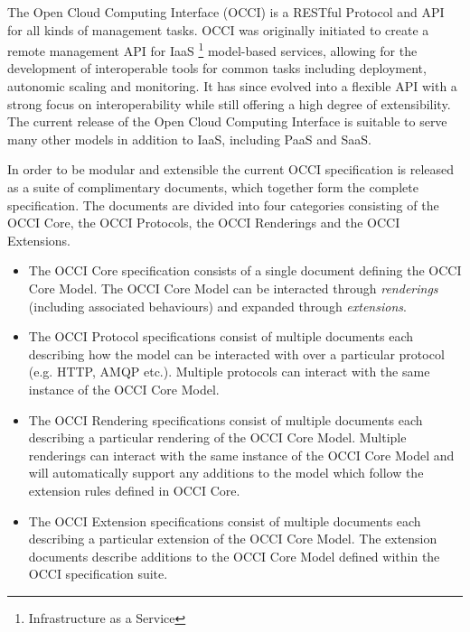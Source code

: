 The Open Cloud Computing Interface (OCCI) is a RESTful Protocol and
API for all kinds of management tasks. OCCI was originally initiated
to create a remote management API for IaaS%
\footnote{Infrastructure as a Service}
model-based services, allowing for the development of interoperable tools for
common tasks including deployment, autonomic scaling and monitoring.
%
It has since evolved into a flexible API with a strong focus on
interoperability while still offering a high degree of extensibility. The
current release of the Open Cloud Computing Interface is suitable to serve many
other models in addition to IaaS, including PaaS and SaaS.

In order to be modular and extensible the current OCCI specification is
released as a suite of complimentary documents, which together form the complete
specification.
%
The documents are divided into four categories consisting of the OCCI Core,
the OCCI Protocols, the OCCI Renderings and the OCCI Extensions.
%
\begin{itemize}
\item The OCCI Core specification consists of a single document defining the
 OCCI Core Model. The OCCI Core Model can be interacted through {\em
 renderings} (including associated behaviours) and expanded through {\em extensions}.
\item The OCCI Protocol specifications consist of multiple documents each
 describing how the model can be interacted with over a particular protocol (e.g. HTTP, AMQP etc.). 
 Multiple protocols can interact with the same instance of the OCCI Core Model.
\item The OCCI Rendering specifications consist of multiple documents each
 describing a particular rendering of the OCCI Core Model. Multiple renderings can
 interact with the same instance of the OCCI Core Model and will automatically support
 any additions to the model which follow the extension rules defined in OCCI
 Core.
\item The OCCI Extension specifications consist of multiple documents
  each describing a particular extension of the OCCI Core Model. The
  extension documents describe additions to the OCCI Core Model
  defined within the OCCI specification suite.
\end{itemize}
%

